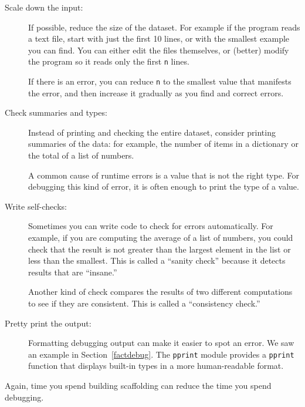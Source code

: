\documentclass[10pt]{book}
\begin{document}
\begin{description}

\item[Scale down the input:] If possible, reduce the size of the
dataset.  For example if the program reads a text file, start with
just the first 10 lines, or with the smallest example you can find.
You can either edit the files themselves, or (better) modify the
program so it reads only the first {\tt n} lines.

If there is an error, you can reduce {\tt n} to the smallest
value that manifests the error, and then increase it gradually
as you find and correct errors.

\item[Check summaries and types:] Instead of printing and checking the
entire dataset, consider printing summaries of the data: for example,
the number of items in a dictionary or the total of a list of numbers.

A common cause of runtime errors is a value that is not the right
type.  For debugging this kind of error, it is often enough to print
the type of a value.

\item[Write self-checks:]  Sometimes you can write code to check
for errors automatically.  For example, if you are computing the
average of a list of numbers, you could check that the result is
not greater than the largest element in the list or less than
the smallest.  This is called a ``sanity check'' because it detects
results that are ``insane.''


Another kind of check compares the results of two different
computations to see if they are consistent.  This is called a
``consistency check.''

\item[Pretty print the output:] Formatting debugging output
can make it easier to spot an error.  We saw an example in
Section~\ref{factdebug}.  The {\tt pprint} module provides
a {\tt pprint} function that displays built-in types in
a more human-readable format.


\end{description}

Again, time you spend building scaffolding can reduce
the time you spend debugging.

\end{document}
